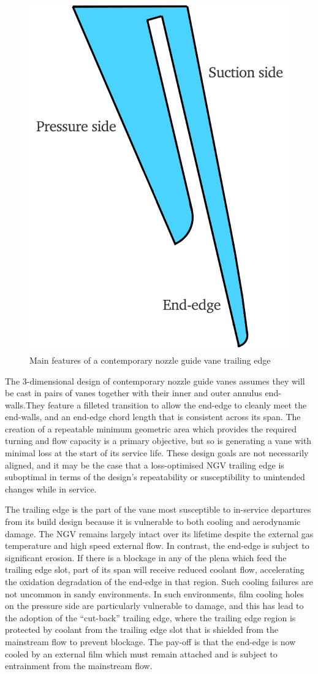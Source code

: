\documentclass[a4paper, 11pt, oneside]{report}
\begin{document}
\begin{figure}[H]
      \centering
      \includegraphics[width=.45\textwidth]{figs/te_features_labelled.png}
      \caption{Main features of a contemporary nozzle guide vane trailing edge}
      \label{fig:te_features_labelled}
\end{figure}

The 3-dimensional design of contemporary nozzle guide vanes assumes they will be cast in pairs of vanes together with their inner and outer annulus end-walls.They feature a filleted transition to allow the end-edge to cleanly meet the end-walls, and an end-edge chord length that is consistent across its span. The creation of a repeatable minimum geometric area which provides the required turning and flow capacity is a primary objective, but so is generating a vane with minimal loss at the start of its service life. These design goals are not necessarily aligned, and it may be the case that  a loss-optimised NGV trailing edge is suboptimal in terms of the design's repeatability or susceptibility to unintended changes while in service.

The trailing edge is the part of the vane most susceptible to in-service departures from its build design because it is vulnerable to both cooling and aerodynamic damage. The NGV remains largely intact over its lifetime despite the external gas temperature and high speed external flow. In contrast, the end-edge is subject to significant erosion. If there is a blockage in any of the plena which feed the trailing edge slot, part of its span will receive reduced coolant flow, accelerating the oxidation degradation of the end-edge in that region. Such cooling failures are not uncommon in sandy environments. In such environments, film cooling holes on the pressure side are particularly vulnerable to damage, and this has lead to the adoption of the ``cut-back'' trailing edge, where the trailing edge region is protected by coolant from the trailing edge slot that is shielded from the mainstream flow to prevent blockage. The pay-off is that the end-edge is now cooled by an external film which must remain attached and is subject to entrainment from the mainstream flow.
\end{document}
